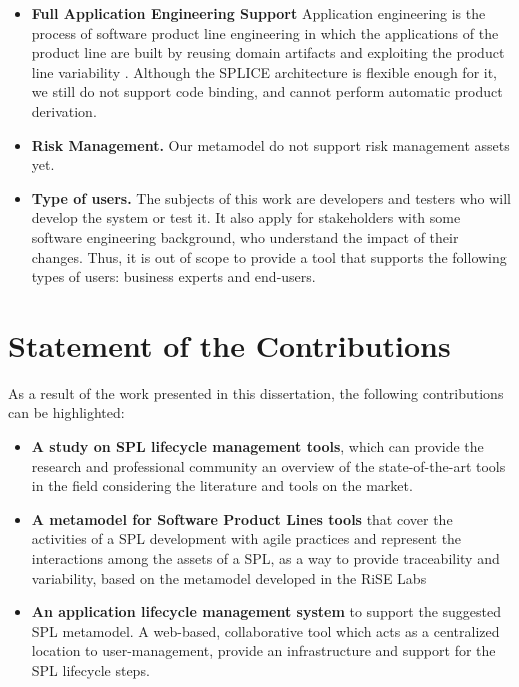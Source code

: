 \begin{itemize}
  \item \textbf{ Full Application Engineering Support } Application engineering is the process of software product line engineering in which the applications of the product line are built by reusing domain artifacts and exploiting the product line variability \citep{Pohl2005}. Although the SPLICE architecture is flexible enough for it, we still do not support code binding, and cannot perform automatic product derivation.  
  
    \item \textbf{Risk Management.} Our metamodel do not support risk management assets yet.
    
    
  \item \textbf{Type of users.} The subjects of this work are
  developers and testers who will develop the system or test it. It also apply for stakeholders with some software engineering background, who understand the impact of their changes. Thus, it is out of scope  to provide a tool that supports the following types of users: business experts and end-users.
\end{itemize}

\section{Statement of the Contributions}
\label{sc:contributions}
As a result of the work presented in this dissertation, the following
contributions can be highlighted:
\begin{itemize}
\item \textbf{A study on SPL lifecycle management tools}, which can provide the research and professional community an overview of the state-of-the-art tools in the field considering the literature and tools on the market.


\item \textbf{A metamodel for Software Product Lines tools} that cover the activities of a \ac{SPL} development with agile practices and represent the interactions among the assets of a \ac{SPL}, as a way to provide traceability and variability, based on the metamodel developed in the \ac{RiSE} Labs \citep{Cavalcanti:2011}


\item \textbf{An application lifecycle management system} to support the suggested \ac{SPL} metamodel. A web-based, collaborative tool which acts as a centralized location to user-management, provide an infrastructure and support for the \ac{SPL} lifecycle steps.

\end{itemize}



